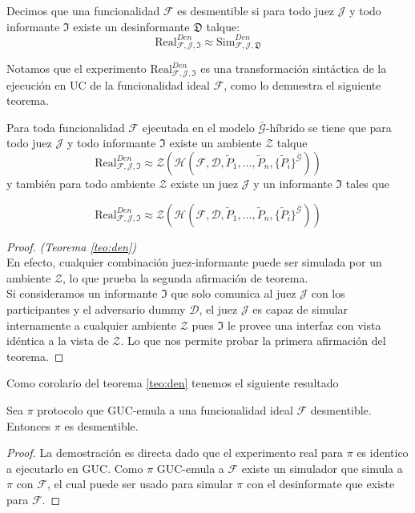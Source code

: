 \begin{definicion}[Desmentibilidad]
Decimos que una funcionalidad $\mathcal{F}$ es
desmentible si para todo juez $\mathcal{J}$ y todo informante
$\mathfrak{I}$ existe un desinformante $\mathfrak{D}$ talque:
$$\mathrm{Real}_{\mathcal{F}, \mathcal{J}, \mathfrak{I}}^{Den} \approx
\mathrm{Sim}_{\mathcal{F}, \mathcal{J}, \mathfrak{D}}^{Den}$$
\end{definicion}

Notamos que el experimento $\mathrm{Real}_{\mathcal{F}, \mathcal{J}, \mathfrak{I}}^{Den}$ es una transformación
sintáctica de la ejecución en UC de la funcionalidad ideal $\mathcal{F}$, como lo demuestra el siguiente teorema.

\begin{teorema}
Para toda funcionalidad $\mathcal{F}$ ejecutada en el modelo $\bar{\mathcal{G}}$-híbrido se tiene que para
todo juez $\mathcal{J}$ y todo informante $\mathfrak{I}$ existe un ambiente $\mathcal{Z}$ talque
$$\mathrm{Real}_{\mathcal{F}, \mathcal{J}, \mathfrak{I}}^{Den} \approx
\mathcal{Z}(\mathcal{H}(
        \mathcal{F},
        \mathcal{D},
        \tilde{P}_1,
        \ldots,
        \tilde{P}_n,
        \{\tilde{P}_i\}^{\bar{\mathcal{G}}}))
$$
y también para todo ambiente $\mathcal{Z}$ existe un juez $\mathcal{J}$ y un informante $\mathfrak{I}$
tales que

$$\mathrm{Real}_{\mathcal{F}, \mathcal{J}, \mathfrak{I}}^{Den} \approx
\mathcal{Z}(\mathcal{H}(
        \mathcal{F},
        \mathcal{D},
        \tilde{P}_1,
        \ldots,
        \tilde{P}_n,
        \{\tilde{P}_i\}^{\bar{\mathcal{G}}}))
$$

\label{teo:den}
\end{teorema}

\begin{proof}
\textit{(Teorema \ref{teo:den})}\\
En efecto, cualquier combinación juez-informante puede ser simulada por un ambiente $\mathcal{Z}$,
lo que prueba la segunda afirmación de teorema.\\
Si consideramos un informante $\mathfrak{I}$ que solo comunica al juez $\mathcal{J}$ con los participantes
y el adversario dummy $\mathcal{D}$, el juez $\mathcal{J}$ es capaz de simular internamente a cualquier
ambiente $\mathcal{Z}$
pues $\mathfrak{I}$ le provee una interfaz con vista idéntica a la vista de $\mathcal{Z}$. Lo que nos
permite probar la primera afirmación del teorema.
\end{proof}

Como corolario del teorema \ref{teo:den} tenemos el siguiente resultado
\begin{corolario}
Sea $\pi$ protocolo que GUC-emula a una funcionalidad
ideal $\mathcal{F}$ desmentible. Entonces $\pi$ es desmentible.
\label{cor:den}
\end{corolario}

\begin{proof}
La demostración es directa dado que el experimento real para $\pi$ es identico a ejecutarlo en GUC.
Como $\pi$ GUC-emula a $\mathcal{F}$ existe un simulador que simula a $\pi$ con $\mathcal{F}$, el cual
puede ser usado para simular $\pi$ con el desinformate que existe para $\mathcal{F}$.
\end{proof}

